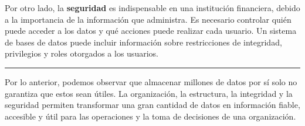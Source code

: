 \vspace{0.2cm}

Por otro lado, la \textbf{seguridad} es indispensable en una institución financiera, debido a la importancia de la información que administra. Es necesario controlar quién puede acceder a los datos y qué acciones puede realizar cada usuario. Un sistema de bases de datos puede incluir información sobre restricciones de integridad, privilegios y roles otorgados a los usuarios.

\vspace{0.3cm}

\noindent
\textcolor{unamblue}{\rule{\textwidth}{1.2pt}}

\vspace{0.3cm}

Por lo anterior, podemos observar que almacenar millones de datos por sí solo no garantiza que estos sean útiles. La organización, la estructura, la integridad y la seguridad permiten transformar una gran cantidad de datos en información fiable, accesible y útil para las operaciones y la toma de decisiones de una organización.
